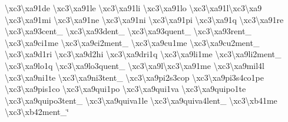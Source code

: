 \begin{DoxyCompactItemize}
\textbackslash{}xc3\textbackslash{}xa91de \textbackslash{}xc3\textbackslash{}xa91le \textbackslash{}xc3\textbackslash{}xa91li \textbackslash{}xc3\textbackslash{}xa91lo \textbackslash{}xc3\textbackslash{}xa91l\textbackslash{}xc3\textbackslash{}xa9 \textbackslash{}xc3\textbackslash{}xa91mi \textbackslash{}xc3\textbackslash{}xa91ne \textbackslash{}xc3\textbackslash{}xa91ni \textbackslash{}xc3\textbackslash{}xa91pi \textbackslash{}xc3\textbackslash{}xa91q \textbackslash{}xc3\textbackslash{}xa91re \textbackslash{}xc3\textbackslash{}xa93cent\-\_\- \textbackslash{}xc3\textbackslash{}xa93dent\-\_\- \textbackslash{}xc3\textbackslash{}xa93quent\-\_\- \textbackslash{}xc3\textbackslash{}xa93rent\-\_\- \textbackslash{}xc3\textbackslash{}xa9ci1me \textbackslash{}xc3\textbackslash{}xa9ci2ment\-\_\- \textbackslash{}xc3\textbackslash{}xa9cu1me \textbackslash{}xc3\textbackslash{}xa9cu2ment\-\_\- \textbackslash{}xc3\textbackslash{}xa9d1ri \textbackslash{}xc3\textbackslash{}xa9d2hi \textbackslash{}xc3\textbackslash{}xa9dri1q \textbackslash{}xc3\textbackslash{}xa9li1me \textbackslash{}xc3\textbackslash{}xa9li2ment\-\_\- \textbackslash{}xc3\textbackslash{}xa9lo1q \textbackslash{}xc3\textbackslash{}xa9lo3quent\-\_\- \textbackslash{}xc3\textbackslash{}xa9l\textbackslash{}xc3\textbackslash{}xa91me \textbackslash{}xc3\textbackslash{}xa9mil4l \textbackslash{}xc3\textbackslash{}xa9ni1te \textbackslash{}xc3\textbackslash{}xa9ni3tent\-\_\- \textbackslash{}xc3\textbackslash{}xa9pi2s3cop \textbackslash{}xc3\textbackslash{}xa9pi3s4co1pe \textbackslash{}xc3\textbackslash{}xa9pis1co \textbackslash{}xc3\textbackslash{}xa9qui1po \textbackslash{}xc3\textbackslash{}xa9qui1va \textbackslash{}xc3\textbackslash{}xa9quipo1te \textbackslash{}xc3\textbackslash{}xa9quipo3tent\-\_\- \textbackslash{}xc3\textbackslash{}xa9quiva1le \textbackslash{}xc3\textbackslash{}xa9quiva4lent\-\_\- \textbackslash{}xc3\textbackslash{}xb41me \textbackslash{}xc3\textbackslash{}xb42ment\-\_\-\char`\"{}
\end{DoxyCompactItemize}


